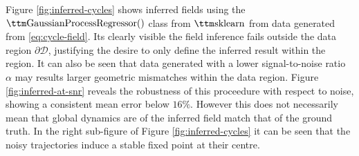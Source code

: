 Figure \ref{fig:inferred-cycles} shows inferred fields using the
$\pythoninline{GaussianProcessRegressor()}$ class from $\pythoninline{sklearn}$
\cite{Seeger2004GaussianLearning.} from data generated from \eqref{eq:cycle-field}.
Its clearly visible the field inference fails outside the data region $\partial\mathcal{D}$,
justifying the desire to only define the inferred result within the region. It can
also be seen that data generated with a lower signal-to-noise ratio $\alpha$ may
results larger geometric mismatches within the data region. Figure \ref{fig:inferred-at-snr}
reveals the robustness of this proceedure with respect to noise, showing a
consistent mean error below $16\%$. However this does not necessarily mean that
global dynamics are of the inferred field match that of the ground truth. In the
right sub-figure of Figure \ref{fig:inferred-cycles} it can be seen that the noisy
trajectories induce a stable fixed point at their centre.

